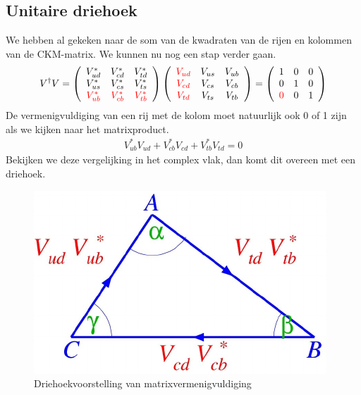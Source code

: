 \documentclass[../main.tex]{subfiles}
\begin{document}
\subsection{Unitaire driehoek}%
\label{sub:unitaire_driehoek}

We hebben al gekeken naar de som van de kwadraten van de rijen en kolommen van de CKM-matrix. We kunnen nu nog een stap verder gaan.
\begin{equation}
    \begin{aligned}
        \label{eq:unitaire_driehoek}
        V^{\dagger} V=\left(\begin{array}{ccc}
                V_{u d}^{*} & V_{c d}^{*} & V_{t d}^{*} \\
                V_{u s}^{*} & V_{c s}^{*} & V_{t s}^{*} \\
                {\color{red} V_{u b}^{*}} & {\color{red} V_{c b}^{*}} & {\color{red} V_{t b}^{*}}
                \end{array}\right)\left(\begin{array}{ccc}
                {\color{red} V_{u d}} & V_{u s} & V_{u b} \\
                {\color{red} V_{c d}} & V_{c s} & V_{c b} \\
                {\color{red} V_{t d}} & V_{t s} & V_{t b}
                \end{array}\right)=\left(\begin{array}{ccc}
                1 & 0 & 0 \\
                0 & 1 & 0 \\
                {\color{red} 0} & 0 & 1
        \end{array}\right)
    \end{aligned}
\end{equation}
De vermenigvuldiging van een rij met de kolom moet natuurlijk ook 0 of 1 zijn als we kijken naar het matrixproduct.
\begin{equation}
    \begin{aligned}
        \label{eq:matrix_vermenigvuldiging}
        V_{u b}^{*} V_{u d}+V_{c b}^{*} V_{c d}+V_{t b}^{*} V_{t d}=0
    \end{aligned}
\end{equation}
Bekijken we deze vergelijking in het complex vlak, dan komt dit overeen met een driehoek.

\begin{figure}[h]
    \centering
    \includegraphics[width=0.6\linewidth]{cp_violation/complexe_driehoek.png}
    \caption{Driehoekvoorstelling van matrixvermenigvuldiging}%
    \label{fig:cp_violation/complexe_driehoek}
\end{figure}
\end{document}
